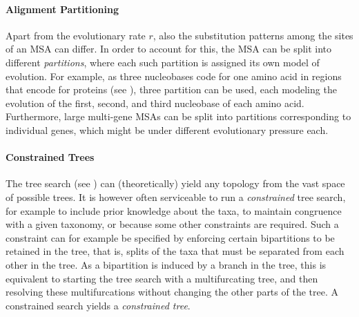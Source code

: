 \paragraph{Alignment Partitioning}
\label{ch:Foundations:sec:MLTreeInference:sub:FurtherAspects:par:AlignmentPartitioning}

Apart from the evolutionary rate $r$, also the substitution patterns among the sites of an MSA can differ.
In order to account for this, the MSA can be split into different \emph{partitions},
where each such partition is assigned its own model of evolution.
For example, as three nucleobases code for one amino acid in regions that encode for proteins
(see ),
three partition can be used, each modeling the evolution of the first, second, and third nucleobase of each amino acid.
Furthermore, large multi-gene MSAs can be split into partitions corresponding to individual genes,
which might be under different evolutionary pressure each.

\paragraph{Constrained Trees}
\label{ch:Foundations:sec:MLTreeInference:sub:FurtherAspects:par:ConstrainedTrees}

The tree search (see )
can (theoretically) yield any topology from the vast space of possible trees.
It is however often serviceable to run a \emph{constrained} tree search,
for example to include prior knowledge about the taxa,
to maintain congruence with a given taxonomy, or because some other constraints are required.
Such a constraint can for example be specified by enforcing certain bipartitions to be retained in the tree,
that is, splits of the taxa that must be separated from each other in the tree.
As a bipartition is induced by a branch in the tree,
this is equivalent to starting the tree search with a multifurcating tree,
and then resolving these multifurcations without changing the other parts of the tree.
A constrained search yields a \emph{constrained tree}.



